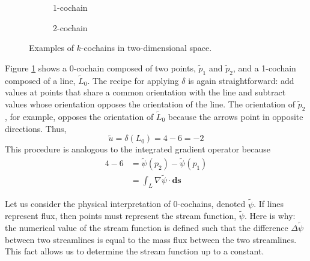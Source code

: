 \begin{figure}[ht]
\begin{subfigure}[c]{0.3\textwidth}
{
            \vfill
        }
        \caption{1-cochain}
        \label{fig:outer1CochainExample}
    \end{subfigure}
    \begin{subfigure}[c]{0.3\textwidth}
        \centering
        \usebox{\boxOuterExample}
        \caption{2-cochain}
        \label{fig:outer2CochainExample}
    \end{subfigure}
    \caption{Examples of $k$-cochains in two-dimensional space.}
    \label{fig:outerCochainExamples}
\end{figure}

Figure \ref{fig:outer1CochainExample} shows a 0-cochain composed of two points, $\tilde{p}_1$ and $\tilde{p}_2$, and a 1-cochain composed of a line, $\tilde{L}_0$. The recipe for applying $\delta$ is again  straightforward: add values at points that share a common orientation with the line and subtract values whose orientation opposes the orientation of the line. The orientation of $\tilde{p}_2$, for example, opposes the orientation of $\tilde{L}_0$ because the arrows point in opposite directions. Thus,\begin{equation}
    \tilde{u} = \delta(L_0) = 4 - 6 = -2
\end{equation}
This procedure is analogous to the integrated gradient operator because
\begin{equation}
    \begin{split}
        4 - 6 &= \tilde{\psi}(p_2) - \tilde{\psi}(p_1) \\
        &= \int_{L} \nabla \tilde{\psi} \cdot \mathbf{ds}
    \end{split}
\end{equation}

Let us consider the physical interpretation of 0-cochains, denoted $\tilde{\psi}$. If lines represent flux, then points must represent the stream function, $\tilde{\psi}$. Here is why: the numerical value of the stream function is defined such that the difference $\Delta \tilde{\psi}$ between two streamlines is equal to the mass flux between the two streamlines. This fact allows us to determine the stream function up to a constant.

